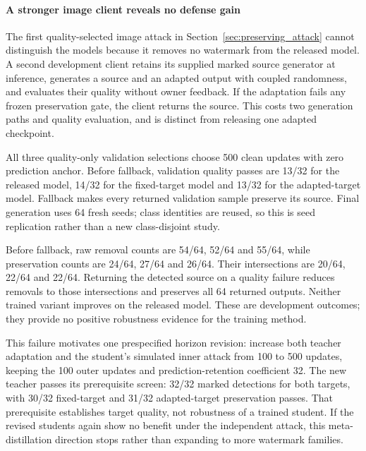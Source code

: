 \paragraph{A stronger image client reveals no defense gain}
\label{sec:fallback_failure}
The first quality-selected image attack in Section~\ref{sec:preserving_attack} cannot distinguish the models because it removes no watermark from the released model. A second development client retains its supplied marked source generator at inference, generates a source and an adapted output with coupled randomness, and evaluates their quality without owner feedback. If the adaptation fails any frozen preservation gate, the client returns the source. This costs two generation paths and quality evaluation, and is distinct from releasing one adapted checkpoint.

All three quality-only validation selections choose 500 clean updates with zero prediction anchor. Before fallback, validation quality passes are 13/32 for the released model, 14/32 for the fixed-target model and 13/32 for the adapted-target model. Fallback makes every returned validation sample preserve its source. Final generation uses 64 fresh seeds; class identities are reused, so this is seed replication rather than a new class-disjoint study.



Before fallback, raw removal counts are 54/64, 52/64 and 55/64, while preservation counts are 24/64, 27/64 and 26/64. Their intersections are 20/64, 22/64 and 22/64. Returning the detected source on a quality failure reduces removals to those intersections and preserves all 64 returned outputs. Neither trained variant improves on the released model. These are development outcomes; they provide no positive robustness evidence for the training method.

This failure motivates one prespecified horizon revision: increase both teacher adaptation and the student's simulated inner attack from 100 to 500 updates, keeping the 100 outer updates and prediction-retention coefficient 32. The new teacher passes its prerequisite screen: 32/32 marked detections for both targets, with 30/32 fixed-target and 31/32 adapted-target preservation passes. That prerequisite establishes target quality, not robustness of a trained student. If the revised students again show no benefit under the independent attack, this meta-distillation direction stops rather than expanding to more watermark families.
